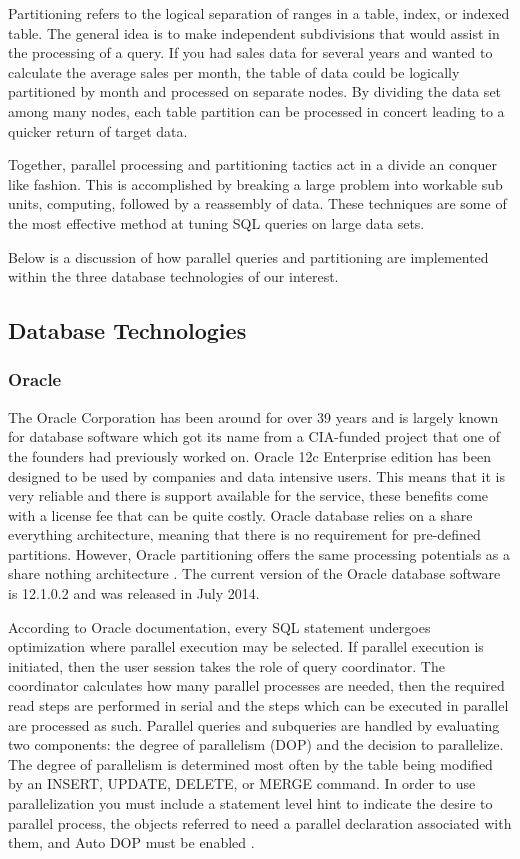 \documentclass[draftclsnofoot, onecolumn, compsoc, 10pt]{IEEEtran}
\begin{document}
Partitioning refers to the logical separation of ranges in a table, index, or indexed table.
The general idea is to make independent subdivisions that would assist in the processing of a query.
If you had sales data for several years and wanted to calculate the average sales per month, the table of data could be logically partitioned by month and processed on separate nodes.
By dividing the data set among many nodes, each table partition can be processed in concert leading to a quicker return of target data.

Together, parallel processing and partitioning tactics act in a divide an conquer like fashion. This is accomplished by breaking a large problem into workable sub units, computing, followed by a reassembly of data. These techniques are some of the most effective method at tuning SQL queries on large data sets. 

Below is a discussion of how parallel queries and partitioning are implemented within the three database technologies of our interest.

\subsection{Database Technologies}

\subsubsection{Oracle}
The Oracle Corporation has been around for over 39 years and is largely known for database software which got its name from a CIA-funded project that one of the founders had previously worked on.
Oracle 12c Enterprise edition has been designed to be used by companies and data intensive users.
This means that it is very reliable and there is support available for the service, these benefits come with a license fee that can be quite costly.
Oracle database relies on a share everything architecture, meaning that there is no requirement for pre-defined partitions. However, Oracle partitioning offers the same processing potentials as a share nothing architecture \cite{How Parallel Execution Works}.
The current version of the Oracle database software is 12.1.0.2 and was released in July 2014.


According to Oracle documentation, every SQL statement undergoes optimization where parallel execution may be selected. If parallel execution  is initiated, then the user session takes the role of query coordinator.
The coordinator calculates how many parallel processes are needed, then the required read steps are performed in serial and the steps which can be executed in parallel are processed as such.
Parallel queries and subqueries are handled by evaluating two components: the degree of parallelism (DOP) and the decision to parallelize.
The degree of parallelism is determined most often by the table being modified by an INSERT, UPDATE, DELETE, or MERGE command.
In order to use parallelization you must include a statement level hint to indicate the desire to parallel process, the objects referred to need a parallel declaration associated with them, and Auto DOP must be enabled \cite{How Parallel Execution Works}.
\end{document}
